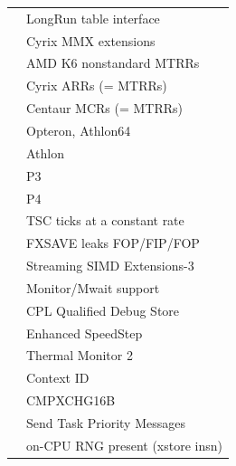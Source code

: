 \begin{longtable}{|ll|}
\hspace{0.5cm}{\tt LRTI} &  LongRun table interface  \\
\hspace{0.5cm}{\tt CXMMX} &  Cyrix MMX extensions  \\
\hspace{0.5cm}{\tt K6\_MTRR} &  AMD K6 nonstandard MTRRs  \\
\hspace{0.5cm}{\tt CYRIX\_ARR} &  Cyrix ARRs (= MTRRs)  \\
\hspace{0.5cm}{\tt CENTAUR\_MCR} &  Centaur MCRs (= MTRRs)  \\
\hspace{0.5cm}{\tt K8} &  Opteron, Athlon64  \\
\hspace{0.5cm}{\tt K7} &  Athlon  \\
\hspace{0.5cm}{\tt P3} &  P3  \\
\hspace{0.5cm}{\tt P4} &  P4  \\
\hspace{0.5cm}{\tt CONSTANT\_TSC} &  TSC ticks at a constant rate  \\
\hspace{0.5cm}{\tt FXSAVE\_LEAK} &  FXSAVE leaks FOP/FIP/FOP  \\
\hspace{0.5cm}{\tt XMM3} &  Streaming SIMD Extensions-3  \\
\hspace{0.5cm}{\tt MWAIT} &  Monitor/Mwait support  \\
\hspace{0.5cm}{\tt DSCPL} &  CPL Qualified Debug Store  \\
\hspace{0.5cm}{\tt EST} &  Enhanced SpeedStep  \\
\hspace{0.5cm}{\tt TM2} &  Thermal Monitor 2  \\
\hspace{0.5cm}{\tt CID} &  Context ID  \\
\hspace{0.5cm}{\tt CX16} &  CMPXCHG16B  \\
\hspace{0.5cm}{\tt XTPR} &  Send Task Priority Messages  \\
\hspace{0.5cm}{\tt XSTORE} &  on-CPU RNG present (xstore insn)  \\

\end{longtable}

